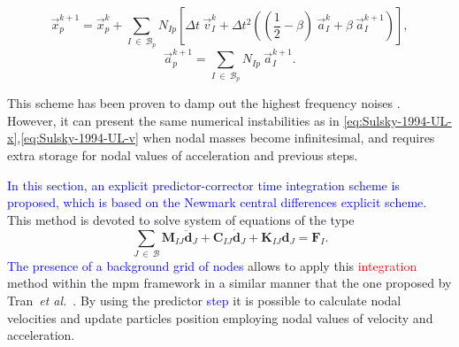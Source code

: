 \documentclass[preprint,12pt,a4paper]{elsarticle}
\newcommand{\Matrix}[1]{
  \ensuremath{\mathbf{{#1}}}
}
\newcommand{\Vector}[1]{
  \ensuremath{\mathbf{{#1}}}
}
\begin{document}
\begin{equation}
\label{eq:Tran-2019-GA-x}
  \vec{x}_p^{k+1} = \vec{x}_p^{k} + \sum_{I\ \in\ \mathcal{B}_p} N_{Ip} \left[ \Delta t\ \vec{v}_{I}^{k}+ \Delta t^2\left( (\frac{1}{2} - \beta)\
    \vec{a}_{I}^{k} + \beta\ \vec{a}_{I}^{k+1} \right) \right],
\end{equation}
\begin{equation}
  \label{eq:Tran-2019-GA-a}
  \vec{a}_p^{k+1} = \sum_{I\ \in\ \mathcal{B}_p} N_{Ip}\ \vec{a}_{I}^{k+1}.
\end{equation}

This scheme has been proven to damp out the highest frequency noises
\cite{Tran2019e}. However, it can present the same numerical instabilities
as in \eqref{eq:Sulsky-1994-UL-x},\eqref{eq:Sulsky-1994-UL-v} when
nodal masses become infinitesimal, and requires extra storage for
nodal values of acceleration and previous steps.

\textcolor{blue}{In this section, an explicit predictor-corrector time integration
scheme is proposed, which is based on the Newmark central differences explicit scheme.} This method is devoted to solve  system of equations of the type
{\color{red}
\begin{equation*}
 \sum_{J\ \in\ \mathcal{B}} \Matrix{M}_{IJ}\ddot{\Vector{d}}_{J} + \Matrix{C}_{IJ}\dot{\Vector{d}}_{J} +
  \Matrix{K}_{IJ}\Vector{d}_{J} = \Vector{F}_{I}.
\end{equation*}
}
\textcolor{blue}{The presence of a background grid of nodes} allows to apply this \textcolor{red}{integration} method within the \acrshort{mpm} framework in a similar manner that the one
proposed by Tran~\textit{et al.}~\cite{Tran2019e}. By using the predictor \textcolor{blue}{step}  it is possible to calculate nodal velocities and update particles position employing nodal values
of velocity and acceleration. 
\end{document}
